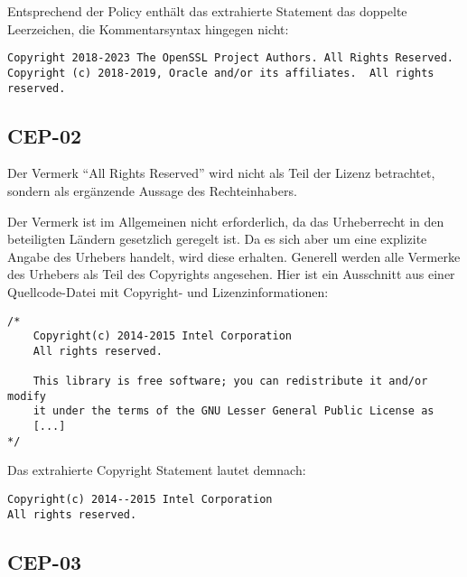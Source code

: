 Entsprechend der Policy enthält das extrahierte Statement das doppelte Leerzeichen, die Kommentarsyntax hingegen nicht:
\begin{lstlisting}[numbers=none, keepspaces=true]
Copyright 2018-2023 The OpenSSL Project Authors. All Rights Reserved.
Copyright (c) 2018-2019, Oracle and/or its affiliates.  All rights reserved.
\end{lstlisting}



\subsection{CEP-02}\label{subsec:cep-02}

Der Vermerk \enquote{All Rights Reserved} wird nicht als Teil der Lizenz betrachtet, sondern als ergänzende Aussage des Rechteinhabers.

Der Vermerk ist im Allgemeinen nicht erforderlich, da das Urheberrecht in den beteiligten Ländern gesetzlich geregelt ist.
Da es sich aber um eine explizite Angabe des Urhebers handelt, wird diese erhalten.
Generell werden alle Vermerke des Urhebers als Teil des Copyrights angesehen.
Hier ist ein Ausschnitt aus einer Quellcode-Datei mit Copyright- und Lizenzinformationen:

\begin{lstlisting}[numbers=none, keepspaces=true]
/*
    Copyright(c) 2014-2015 Intel Corporation
    All rights reserved.

    This library is free software; you can redistribute it and/or modify
    it under the terms of the GNU Lesser General Public License as
    [...]
*/
\end{lstlisting}

Das extrahierte Copyright Statement lautet demnach:

\begin{lstlisting}[numbers=none, keepspaces=true]
Copyright(c) 2014--2015 Intel Corporation
All rights reserved.
\end{lstlisting}


\subsection{CEP-03}\label{subsec:cep-03}

